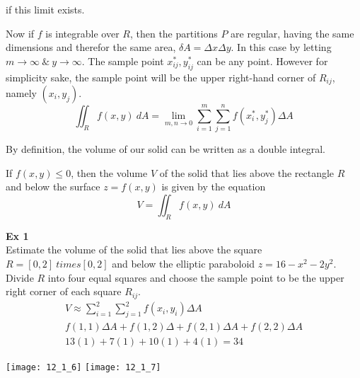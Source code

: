 \documentclass{article}
\begin{document}
  if this limit exists.

  Now if $ f $ is integrable over $ R $, then the partitions $ P $ are regular, having the same dimensions and therefor the same area, $ \delta A = \Delta x \Delta y $. In this case by letting $ m\to \infty ~\&~ y\to \infty $. The sample point $ x^{*}_{ij},y^{*}_{ij} $ can be any point. However for simplicity sake, the sample point will be the upper right-hand corner of $ R_{ij} $, namely $ (x_i,y_j) $.
  \[
    \iint_R f(x,y)~dA = \lim_{m,n \to 0}  \sum^{m}_{i=1} \sum^{n}_{j=1} f(x^{*}_{i},y^{*}_{j}) \Delta A_{}
  \]
  
 By definition, the volume of our solid can be written as a double integral. 

 If $ f(x,y) \le 0$, then the volume $ V $ of the solid that lies above the rectangle $ R $ and below the surface $ z=f(x,y) $ is given by the equation
 \[
   V = \iint_R f(x,y)~dA
 \]

 \textbf{Ex 1}\\
 Estimate the volume of the solid that lies above the square $ R = [0,2] \ times [0,2] $ and below the elliptic paraboloid $ z=16-x^{2}-2y^{2} $. Divide $ R $ into four equal squares and choose the sample point to be the upper right corner of each square $ R_{ij} $.
 \[
   \begin{gathered}
   V \approx \sum^{2}_{i=1}\sum^{2}_{j=1} f(x_i,y_i) \Delta A\\
   f(1,1) \Delta A + f(1,2) \Delta + f(2,1) \Delta A + f(2,2) \Delta A\\
   13(1)+7(1)+10(1)+4(1) = \boxed{34}
   \end{gathered}
 \]

 \begin{center}
   \texttt{[image: 12\_1\_6]} \qquad \texttt{[image: 12\_1\_7]}
 \end{center}
 
  
\end{document}
